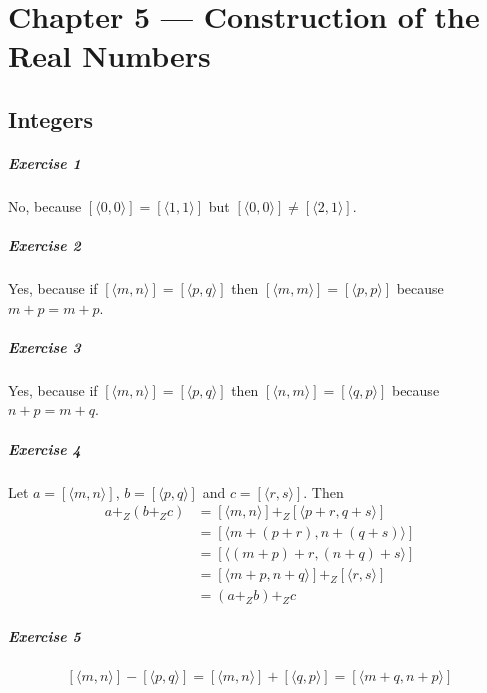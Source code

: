 \documentclass{report}
\begin{document}
    \chapter{Chapter 5 --- Construction of the Real Numbers}

    \section{Integers}
    
    \paragraph{Exercise 1}
    No, because $[\langle 0,0 \rangle] = [\langle 1,1 \rangle]$ but $[\langle 0,0 \rangle] \neq [\langle
        2,1 \rangle]$.

    \paragraph{Exercise 2}
    Yes, because if $[\langle m,n \rangle] = [\langle p,q \rangle]$ then $[\langle m,m \rangle] =
    [\langle p,p \rangle]$ because $m + p = m + p$.

    \paragraph{Exercise 3}
    Yes, because if $[\langle m,n \rangle] = [\langle p,q \rangle]$ then $[\langle n,m \rangle] =
    [\langle q,p \rangle]$ because $n + p = m + q$.

    \paragraph{Exercise 4}
    Let $a = [\langle m,n \rangle]$, $b = [\langle p,q \rangle]$ and $c = [\langle r,s \rangle]$.
    Then
    \begin{align*}
        a +_Z (b +_Z c) & = [\langle m,n \rangle] +_Z [\langle p + r, q + s \rangle] \\
        & = [\langle m + (p + r), n + (q + s) \rangle] \\
        & = [\langle (m + p) + r, (n + q) + s \rangle] \\
        & = [\langle m + p, n + q \rangle] +_Z [\langle r,s \rangle] \\
        & = (a +_Z b) +_Z c
    \end{align*}

    \paragraph{Exercise 5}
    \[ [\langle m,n \rangle] - [\langle p,q \rangle] = [\langle m,n \rangle] + [\langle q,p \rangle]
    = [\langle m+q, n+p \rangle] \]
\end{document}
